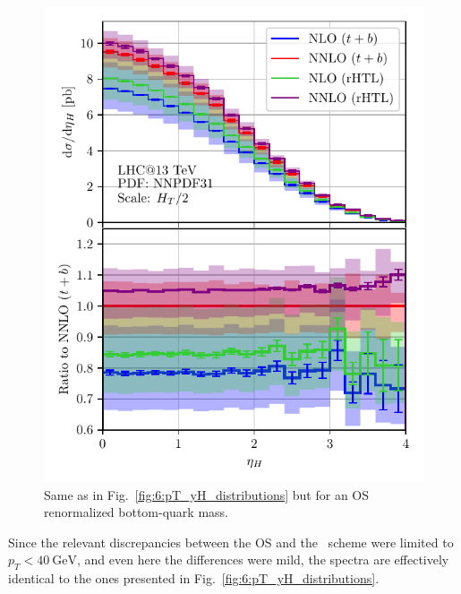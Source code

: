 \begin{figure}[ht]
\begin{minipage}[t]{0.49\textwidth}
  \includegraphics[width=\textwidth]{Images/yH_13000_bOS_tOS.pdf}
\end{minipage}
\caption{Same as in Fig.~\ref{fig:6:pT_yH_distributions} but for an \acs{OS} renormalized bottom-quark mass.}
\label{fig:app4:pT_yH_distributions}
\end{figure}
Since the relevant discrepancies between the \acs{OS} and the \MS\ scheme were limited to $p_T< 40\ \mathrm{GeV}$, and even here the differences were mild, the spectra are effectively identical to the ones presented in Fig.~\ref{fig:6:pT_yH_distributions}.